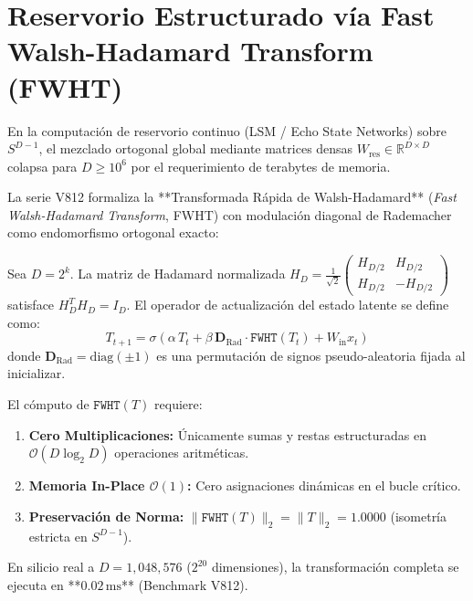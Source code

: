 \section{Reservorio Estructurado vía Fast Walsh-Hadamard Transform (FWHT)}


En la computación de reservorio continuo (LSM / Echo State Networks) sobre $S^{D-1}$, el mezclado ortogonal global mediante matrices densas $W_{\text{res}} \in \mathbb{R}^{D \times D}$ colapsa para $D \ge 10^6$ por el requerimiento de terabytes de memoria. 

La serie V812 formaliza la **Transformada Rápida de Walsh-Hadamard** (\emph{Fast Walsh-Hadamard Transform}, FWHT) con modulación diagonal de Rademacher como endomorfismo ortogonal exacto:

\begin{definition}
Sea $D = 2^k$. La matriz de Hadamard normalizada $H_D = \frac{1}{\sqrt{2}} \begin{pmatrix} H_{D/2} & H_{D/2} \\ H_{D/2} & -H_{D/2} \end{pmatrix}$ satisface $H_D^T H_D = I_D$. El operador de actualización del estado latente se define como:
\begin{equation}
T_{t+1} = \sigma\left( \alpha \, T_t + \beta \, \mathbf{D}_{\text{Rad}} \cdot \texttt{FWHT}(T_t) + W_{\text{in}} x_t \right)
\end{equation}
donde $\mathbf{D}_{\text{Rad}} = \text{diag}(\pm 1)$ es una permutación de signos pseudo-aleatoria fijada al inicializar.
\end{definition}

\begin{theorem}

El cómputo de $\texttt{FWHT}(T)$ requiere:
\begin{enumerate}
    \item \textbf{Cero Multiplicaciones:} Únicamente sumas y restas estructuradas en $\mathcal{O}(D \log_2 D)$ operaciones aritméticas.
    \item \textbf{Memoria In-Place $\mathcal{O}(1)$:} Cero asignaciones dinámicas en el bucle crítico.
    \item \textbf{Preservación de Norma:} $\| \texttt{FWHT}(T) \|_2 = \| T \|_2 = 1.0000$ (isometría estricta en $S^{D-1}$).
\end{enumerate}
En silicio real a $D = 1{,}048{,}576$ ($2^{20}$ dimensiones), la transformación completa se ejecuta en **$0.02\,\text{ms}$** (Benchmark V812).
\end{theorem}

